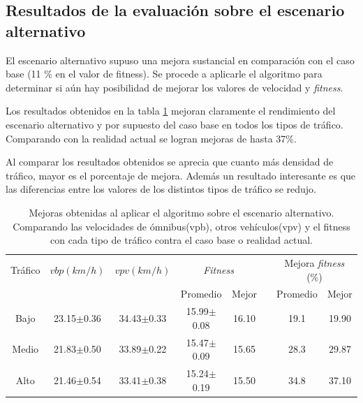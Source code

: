 \subsection{Resultados de la evaluación sobre el escenario alternativo}

El escenario alternativo supuso una mejora sustancial en comparación con el caso base (11 \% en el valor de fitness). Se procede a aplicarle el algoritmo para determinar si aún hay posibilidad de mejorar los valores de velocidad y \emph{fitness}.


Los resultados obtenidos en la tabla \ref{table:mejoras_trafico_alternativo_algoritmo}  mejoran claramente el rendimiento del escenario alternativo y por supuesto del caso base en todos los tipos de tráfico. Comparando con la realidad actual se logran mejoras de hasta 37\%. 

Al comparar los resultados obtenidos se aprecia que cuanto más densidad de tráfico, mayor es el porcentaje de mejora. Además un resultado interesante es que las diferencias entre los valores de los distintos tipos de tráfico se redujo.




\begin{table}[h]
	\renewcommand{\arraystretch}{1.2}
	\caption{Mejoras obtenidas al aplicar el algoritmo sobre el escenario alternativo. Comparando las velocidades de ómnibus(vpb), otros vehículos(vpv) y el fitness con cada tipo de tráfico contra el caso base o realidad actual.}
	\label{table:mejoras_trafico_alternativo_algoritmo}
	\centering
	\begin{tabular}{cccccccc}
		\hline 
		Tráfico& 
		$vbp(km/h)$& 
		$vpv(km/h)$&
		\multicolumn{2}{c}{\emph{Fitness}}&  & 
		\multicolumn{2}{c}{Mejora \emph{fitness} (\%)}\\  \cline{4-5} \cline{7-8}&     &     & \multicolumn{1}{c}{Promedio} & \multicolumn{1}{c}{Mejor} &  & \multicolumn{1}{c}{Promedio} & \multicolumn{1}{c}{Mejor} \\ \hline

		Bajo & 23.15$\pm$0.36 & 34.43$\pm$0.33 & 15.99$\pm$0.08 & 16.10 & & 19.1& 19.90 \\
		Medio & 21.83$\pm$0.50  & 33.89$\pm$0.22 & 15.47$\pm$0.09& 15.65 & & 28.3 & 29.87\\
		Alto & 21.46$\pm$0.54  & 33.41$\pm$0.38 & 15.24$\pm$0.19& 15.50 & & 34.8 & 37.10\\	
		\hline		    
	\end{tabular}
\end{table}


